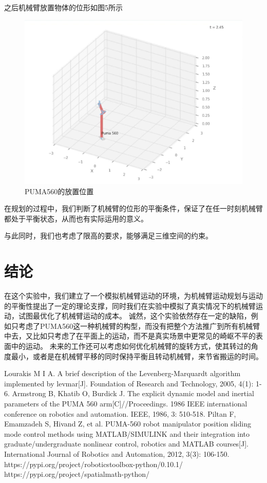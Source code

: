 \documentclass[conference]{IEEEtran}
\begin{document}
\begin{enumerate}
    之后机械臂放置物体的位形如图5所示

    \begin{figure}[htbp]
        \includegraphics[width=\linewidth]{goal.png}
        \caption{PUMA560的放置位置}
    \end{figure}

    在规划的过程中，我们判断了机械臂的位形的平衡条件，保证了在任一时刻机械臂都处于平衡状态，从而也有实际运用的意义。

    与此同时，我们也考虑了限高的要求，能够满足三维空间的约束。
\end{enumerate}

\section{结论}
在这个实验中，我们建立了一个模拟机械臂运动的环境，为机械臂运动规划与运动的平衡性提出了一定的理论支撑，同时我们在实验中模拟了真实情况下的机械臂运动，试图最优化了机械臂运动的成本。
诚然，这个实验依然存在一定的缺陷，例如只考虑了PUMA560这一种机械臂的构型，而没有把整个方法推广到所有机械臂中去，又比如只考虑了在平面上的运动，而不是真实场景中更常见的崎岖不平的表面中的运动。
未来的工作还可以考虑如何优化机械臂的旋转方式，使其转过的角度最小，或者是在机械臂平移的同时保持平衡且转动机械臂，来节省搬运的时间。
\begin{thebibliography}{00}
 Lourakis M I A. A brief description of the Levenberg-Marquardt algorithm implemented by levmar[J]. Foundation of Research and Technology, 2005, 4(1): 1-6.
 Armstrong B, Khatib O, Burdick J. The explicit dynamic model and inertial parameters of the PUMA 560 arm[C]//Proceedings. 1986 IEEE international conference on robotics and automation. IEEE, 1986, 3: 510-518.
 Piltan F, Emamzadeh S, Hivand Z, et al. PUMA-560 robot manipulator position sliding mode control methods using MATLAB/SIMULINK and their integration into graduate/undergraduate nonlinear control, robotics and MATLAB courses[J]. International Journal of Robotics and Automation, 2012, 3(3): 106-150.
 https://pypi.org/project/roboticstoolbox-python/0.10.1/
 https://pypi.org/project/spatialmath-python/
\end{thebibliography}
\end{document}
